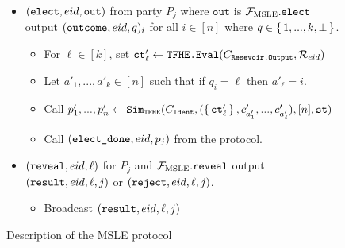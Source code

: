 \begin{figure}
{\begin{minipage}{1\textwidth}
\begin{itemize}
				\item $(\texttt{elect}, {eid}, \texttt{out})$ from party $P_j$ where $\texttt{out}$ is $\mathcal{F}_{\text{MSLE}}.\texttt{elect}$ output $(\texttt{outcome}, {eid}, q)_i$ for all $i \in [n]$ where $q \in \set{1, ..., k, \bot}$.

				      \begin{itemize}
					      \item For $\ell \in [k]$, set $\texttt{ct}'_\ell \gets \texttt{TFHE.Eval}(C_{\texttt{Resevoir.Output}}, \mathcal{R}_{eid})$
					      \item Let $a'_1, ..., a'_k \in [n]$ such that if $q_i = \ell$ then $a'_\ell = i$.
					      \item Call $p'_1, ..., p'_{n} \gets \texttt{Sim}_{{\texttt{TFHE}}}(C_\texttt{Ident}, (\set{\texttt{ct}'_\ell}, c'_{a'_1}, ..., c'_{a'_\ell}), [n], \texttt{st})$
					      \item Call $(\texttt{elect\_done}, {eid}, p_j)$ from the protocol.
				      \end{itemize}
				\item $(\texttt{reveal}, {eid}, \ell)$ for $P_j$ and $\mathcal{F}_{\text{MSLE}}.\texttt{reveal}$ output $(\texttt{result}, {eid}, \ell, j)$ or $(\texttt{reject}, {eid}, \ell, j)$.
				      \begin{itemize}
					      \item Broadcast $(\texttt{result}, {eid}, \ell, j)$
				      \end{itemize}
			\end{itemize}
		\end{minipage}
	}
	\caption{Description of the MSLE protocol}
	\label{fig:simMSLE}
\end{figure}


